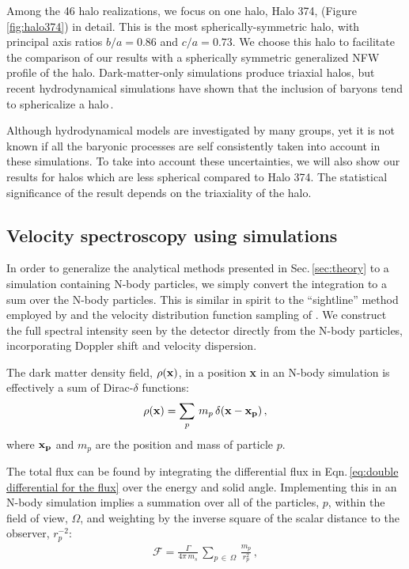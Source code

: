 \documentclass[aps,prd,10pt,twocolumn,superscriptaddress,showpacs]{revtex4-1}
\begin{document}
Among the 46 halo realizations, we focus on one halo, Halo 374, (Figure\,\ref{fig:halo374}) in detail. This is the most spherically-symmetric halo, with principal axis ratios $b/a=0.86$ and $c/a=0.73$.  We choose this halo to facilitate the comparison of our results with a spherically symmetric generalized NFW profile of the halo.  Dark-matter-only simulations produce triaxial halos, but recent hydrodynamical simulations have shown that the inclusion of baryons tend to sphericalize a halo\,\cite{Debattista:2007yz,Bryan:2012mw,Bernal:2014mmt,Bernal:2016guq}.

Although hydrodynamical models are investigated by many groups, yet it is not known if all the baryonic processes are self consistently taken into account in these simulations.  To take into account these uncertainties, we will also show our results for halos which are less spherical compared to Halo 374.  The statistical significance of the result depends on the triaxiality of the halo.

\subsection{Velocity spectroscopy using simulations}
\label{sec:simulations}

In order to generalize the analytical methods presented in Sec.\,\ref{sec:theory} to a simulation containing N-body particles, we simply convert the integration to a sum over the N-body particles.  This is similar in spirit to the ``sightline'' method employed by \cite{Lovell:2014lea} and the velocity distribution function sampling of \cite{Mao:2012hf}.  We construct the full spectral intensity seen by the detector directly from the N-body particles, incorporating Doppler shift and velocity dispersion.   

The dark matter density field, $\rho({\bf{x}})$, in a position {\bf x} in an N-body simulation is effectively a sum of Dirac-$\delta$ functions:
\begin{eqnarray}
\rho({\bf{x}}) = \sum_p\, m_p \, \delta({\bf{x}} - {\bf{x}_p}) \, ,
\end{eqnarray}
where $\bf{x}_p$ and $m_p$ are the position and mass of particle $p$. 

The total flux can be found by integrating the differential flux in Eqn.\,\ref{eq:double differential for the flux} over the energy and solid angle.  Implementing this in an N-body simulation implies a summation over all of the particles, $p$, within the field of view, $\Omega$, and weighting by the inverse square of the scalar distance to the observer, $r^{-2}_p$:
\begin{eqnarray} 
\mathcal{F} = \frac{\Gamma}{4\pi \, m_s} \, \sum_{p \, \in \, \Omega} \, \frac{m_p}{r_p^{2}} \, ,
\end{eqnarray}
\end{document}
